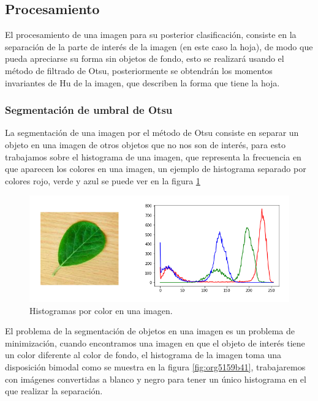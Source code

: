 \documentclass[letter]{article}
\begin{document}
\subsection{Procesamiento}
\label{sec:org9376f4f}
El procesamiento de una imagen para su posterior clasificación, consiste en la
separación de la parte de interés de la imagen (en este caso la hoja), de modo
que pueda apreciarse su forma sin objetos de fondo, esto se realizará usando el
método de filtrado de Otsu, posteriormente se obtendrán los momentos invariantes
de Hu de la imagen, que describen la forma que tiene la hoja.

\subsubsection{Segmentación de umbral de Otsu}
\label{sec:orgee30221}
La segmentación de una imagen por el método de Otsu consiste en separar un
objeto en una imagen de otros objetos que no nos son de interés, para esto
trabajamos sobre el histograma de una imagen, que representa la frecuencia en
que aparecen los colores en una imagen, un ejemplo de histograma separado por
colores rojo, verde y azul se puede ver en la figura \ref{fig:orgb5528ac}

\begin{figure}[htbp]
\centering
\includegraphics[width=.9\linewidth]{./images/histogram1.png}
\caption{\label{fig:orgb5528ac}Histogramas por color en una imagen.}
\end{figure}

El problema de la segmentación de objetos en una imagen es un problema de
minimización, cuando encontramos una imagen en que el objeto de interés tiene un
color diferente al color de fondo, el histograma de la imagen toma una
disposición bimodal como se muestra en la figura \ref{fig:org5159b41}, trabajaremos con
imágenes convertidas a blanco y negro para tener un único histograma en el que
realizar la separación.
\end{document}
